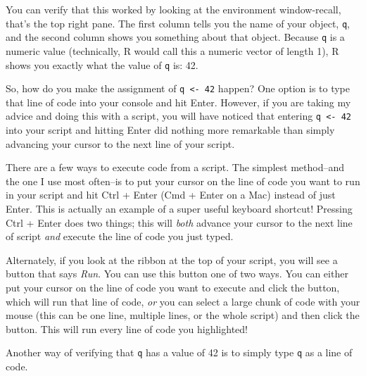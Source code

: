 \documentclass[
  letterpaper,
]{book}
\begin{document}
You can verify that this worked by looking at the environment
window-recall, that's the top right pane. The first column tells you the
name of your object, \texttt{q}, and the second column shows you
something about that object. Because \texttt{q} is a numeric value
(technically, R would call this a numeric vector of length 1), R shows
you exactly what the value of \texttt{q} is: 42.

\begin{tcolorbox}[enhanced jigsaw, colframe=quarto-callout-tip-color-frame, breakable, arc=.35mm, bottomtitle=1mm, bottomrule=.15mm, colbacktitle=quarto-callout-tip-color!10!white, rightrule=.15mm, colback=white, opacityback=0, opacitybacktitle=0.6, coltitle=black, left=2mm, toptitle=1mm, toprule=.15mm, titlerule=0mm, leftrule=.75mm, title=\textcolor{quarto-callout-tip-color}{\faLightbulb}\hspace{0.5em}{Tip from the Helpdesk: Script it and Rip it}]

So, how do you make the assignment of \texttt{q\ \textless{}-\ 42}
happen? One option is to type that line of code into your console and
hit Enter. However, if you are taking my advice and doing this with a
script, you will have noticed that entering \texttt{q\ \textless{}-\ 42}
into your script and hitting Enter did nothing more remarkable than
simply advancing your cursor to the next line of your script.

There are a few ways to execute code from a script. The simplest
method--and the one I use most often--is to put your cursor on the line
of code you want to run in your script and hit Ctrl + Enter (Cmd + Enter
on a Mac) instead of just Enter. This is actually an example of a super
useful keyboard shortcut! Pressing Ctrl + Enter does two things; this
will \emph{both} advance your cursor to the next line of script
\emph{and} execute the line of code you just typed.

Alternately, if you look at the ribbon at the top of your script, you
will see a button that says \emph{Run}. You can use this button one of
two ways. You can either put your cursor on the line of code you want to
execute and click the button, which will run that line of code,
\emph{or} you can select a large chunk of code with your mouse (this can
be one line, multiple lines, or the whole script) and then click the
button. This will run every line of code you highlighted!

\end{tcolorbox}

Another way of verifying that \texttt{q} has a value of 42 is to simply
type \texttt{q} as a line of code.
\end{document}
